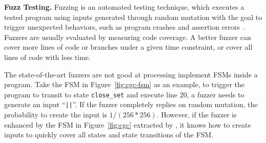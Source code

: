 \noindent\textbf{Fuzz Testing.}
Fuzzing is an automated testing technique, 
which executes a tested program
using inputs generated through random mutation 
with the goal to trigger unexpected behaviors,
such as program crashes and assertion errors~\cite{afl,Angora,youwei-1}. 
Fuzzers are usually evaluated by measuring code coverage. 
A better fuzzer can cover more lines of code 
or branches under a given time constraint, 
or cover all lines of code with less time. 

The state-of-the-art fuzzers are not good at processing 
implement FSMs inside a program.
Take the FSM in Figure~\ref{fig:cgc-fsm} as an example, 
to trigger the program to transit to state \texttt{close\_set} and execute line 20, 
a fuzzer needs to generate an input ``\verb/||/''. 
If the fuzzer completely replies on random mutation, the probability to 
create the input is $1/(256 * 256)$. 
However, if the fuzzer is enhanced by the 
FSM in Figure~\ref{fig:cgc} extracted by \Tool{}, 
it knows how to create inputs to quickly cover 
all states and state transitions of the FSM.  




